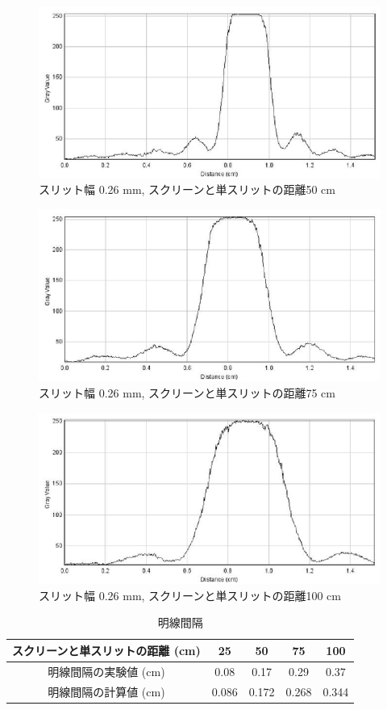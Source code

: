 \documentclass[11pt,a4]{jarticle}
\begin{document}
\begin{figure}[htbp]
   \begin{center}
    \includegraphics[width=0.48\hsize]{./260um_50cm_profile.eps}
    \caption{スリット幅 0.26 mm, スクリーンと単スリットの距離50 cm}
     \label{fig:260um_50cm}
   \end{center}
\end{figure}\begin{figure}[htbp]
   \begin{center}
    \includegraphics[width=0.48\hsize]{./260um_75cm_profile.eps}
    \caption{スリット幅 0.26 mm, スクリーンと単スリットの距離75 cm}
     \label{fig:260um_75cm}
   \end{center}
\end{figure}\begin{figure}[htbp]
   \begin{center}
    \includegraphics[width=0.48\hsize]{./260um_100cm_profile.eps}
    \caption{スリット幅 0.26 mm, スクリーンと単スリットの距離100 cm}
     \label{fig:260um_100cm}
   \end{center}
\end{figure}

\begin{table}[htbp]
   \begin{center}
  \begin{tabular}{c|cccc}
     スクリーンと単スリットの距離 (cm) & 25 & 50 & 75 & 100 \\ \hline
    明線間隔の実験値 (cm) & 0.08 & 0.17 & 0.29 & 0.37\\
    明線間隔の計算値 (cm) & 0.086 & 0.172 & 0.268 & 0.344
  \end{tabular}
  \label{tab:260um}
     \end{center}
       \caption{明線間隔}
\end{table}
\end{document}
